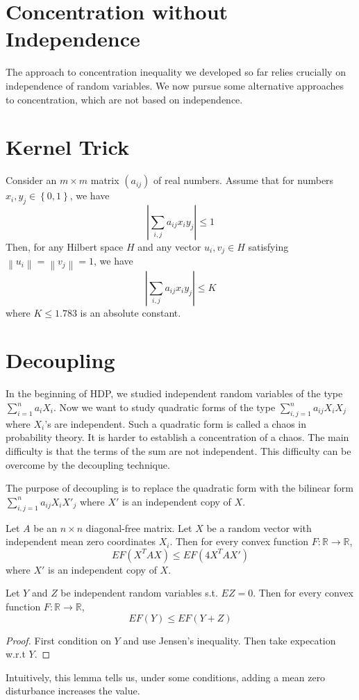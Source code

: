 \section{Concentration without Independence}
The approach to concentration inequality we developed so far relies crucially on independence of random variables.
We now pursue some alternative approaches to concentration, which are not based on independence.


\section{Kernel Trick}
\begin{theorem}
    Consider an $m\times m$ matrix $(a_{ij})$ of real numbers. Assume that for numbers $x_i,y_j\in\left\{0,1\right\}$,
    we have \[\left|\sum_{i,j}a_{ij}x_iy_j\right|\le 1\] 
    Then, for any Hilbert space $H$ and any vector $u_i,v_j\in H$ satisfying $\left\|u_i\right\|=\left\|v_j\right\|=1$,
    we have \[\left|\sum_{i,j}a_{ij}x_iy_j\right|\le K\] 
    where $K\le 1.783$ is an absolute constant.
\end{theorem}

\section{Decoupling}
In the beginning of HDP, we studied independent random variables of the type $\sum_{i=1}^n a_iX_i$.
Now we want to study quadratic forms of the type $\sum_{i,j=1}^na_{ij}X_iX_j$ where $X_i$'s are independent. Such a quadratic form is called a chaos in probability theory.
It is harder to establish a concentration of a chaos. The main difficulty is that the terms of the sum are not independent.
This difficulty can be overcome by the decoupling technique.\par 
The purpose of decoupling is to replace the quadratic form with the bilinear form $\sum_{i,j=1}^na_{ij}X_iX'_j$ where $X'$ is an independent copy of $X$.
\begin{theorem}[decoupling]
    Let $A$ be an $n\times n$ diagonal-free matrix. Let $X$ be a random vector with independent mean zero coordinates $X_i$.
    Then for every convex function $F:\mathbb{R}\to \mathbb{R}$, 
    \[EF(X^TAX)\le EF(4X^TAX')\] 
    where $X'$ is an independent copy of $X$.
\end{theorem}

\begin{lemma}
    Let $Y$ and $Z$ be independent random variables s.t. $EZ=0$. Then for every convex function $F:\mathbb{R}\to\mathbb{R}$,
    \[EF(Y)\le EF(Y+Z)\]
\end{lemma}
\begin{proof}
    First condition on $Y$ and use Jensen's inequality. Then take expecation w.r.t $Y$.
\end{proof}
\begin{remark}
    Intuitively, this lemma tells us, under some conditions, adding a mean zero disturbance increases the value.
\end{remark}

